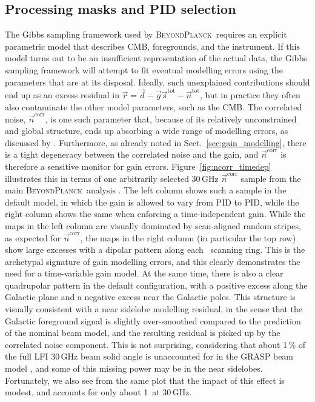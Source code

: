 \documentclass[twocolumn]{aa}
\renewcommand{\d}[0]{\vec{d}}
\newcommand{\n}[0]{\vec{n}}
\newcommand{\s}[0]{\vec{s}}
\newcommand{\g}[0]{\vec{g}}
\renewcommand{\r}[0]{\vec{r}}
\newcommand{\BP}{\textsc{BeyondPlanck}}
\newcommand{\tot}[0]{^{\mathrm{tot}}}
\newcommand{\corr}[0]{^{\mathrm{corr}}}
\begin{document}
\subsection{Processing masks and PID selection}
\label{sec:procmasks}
The Gibbs sampling framework used by \BP\ requires an explicit
parametric model that describes CMB, foregrounds, and the
instrument. If this model turns out to be an insufficient
representation of the actual data, the Gibbs sampling framework will
attempt to fit eventual modelling errors using the parameters that are
at its disposal. Ideally, such unexplained contributions should end up
as an excess residual in $\r = \d - \g\s\tot - \n\tot$, but in
practice they often also contaminate the other model parameters, such
as the CMB. The correlated noise, $\n\corr$, is one such parameter
that, because of its relatively unconstrained and global structure,
ends up absorbing a wide range of modelling errors, as discussed by
\citet{bp06}. Furthermore, as already noted in
Sect.~\ref{sec:gain_modelling}, there is a tight degeneracy between
the correlated noise and the gain, and $\n\corr$ is therefore a
sensitive monitor for gain errors. Figure~\ref{fig:ncorr_timedep}
illustrates this in terms of one arbitrarily selected 30\,GHz
$\n\corr$ sample from the main \BP\ analysis \citep{bp01}. The left
column shows such a sample in the default model, in which the gain is
allowed to vary from PID to PID, while the right column shows the same
when enforcing a time-independent gain. While the maps in the left
column are visually dominated by scan-aligned random stripes, as
expected for $\n\corr$, the maps in the right column (in particular
the top row) show large excesses with a dipolar pattern along each
\Planck\ scanning ring. This is the archetypal signature of gain
modelling errors, and this clearly demonstrates the need for a
time-variable gain model. At the same time, there is also a clear
quadrupolar pattern in the default configuration, with a positive
excess along the Galactic plane and a negative excess near the
Galactic poles. This structure is visually consistent with a near
sidelobe modelling residual, in the sense that the Galactic foreground
signal is slightly over-smoothed compared to the prediction of the
nominal beam model, and the resulting residual is picked up by the
correlated noise component. This is not surprising, considering that
about 1\,\% of the full LFI 30\,GHz beam solid angle is unaccounted
for in the GRASP beam model \citep{planck2016-l02}, and some of this
missing power may be in the near sidelobes. Fortunately, we also see
from the same plot that the impact of this effect is modest, and
accounts for only about 1\muK\ at 30\,GHz.
\end{document}
